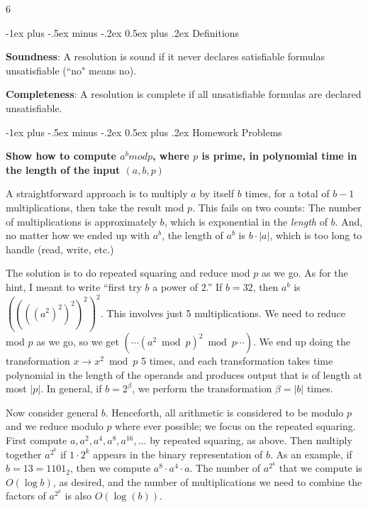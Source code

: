 \documentclass[2pt,legalpaper]{scrartcl}
\makeatletter
\renewcommand{\section}{\@startsection{section}{1}{0mm}
  {-1ex plus -.5ex minus -.2ex}
  {0.5ex plus .2ex}
{\normalfont\large\bfseries}}
\makeatother
\begin{document}
\begin{multicols}{6}
\begin{itemize}
  \end{itemize}


  \section{Definitions}

  {\bf Soundness}: A resolution is sound if it never declares satisfiable formulas unsatisfiable (``no" means no).

  {\bf Completeness}: A resolution is complete if all unsatisfiable formulas are declared unsatisfiable.

  \section{Homework Problems}

  {\bf Show how to compute $a^b mod p$, where $p$ is prime, in polynomial time in the length of the input $(a, b, p)$}

  A straightforward approach is to multiply $a$ by itself $b$
  times, for a total of $b-1$ multiplications, then take the result mod
  $p$.  This fails on two counts:  The number of multiplications is
  approximately $b$, which is exponential in the {\em length} of $b$.
  And, no matter how we ended up with $a^b$, the length of $a^b$ is
  $b\cdot|a|$, which is too long to handle (read, write, etc.)

  The solution is to do repeated squaring and reduce mod $p$ as we go.
  As for the hint, I meant to write ``first try $b$ a power of 2.''  If
  $b=32$, then $a^b$ is $((((a^2)^2)^2)^2)^2$.  This involves just 5
  multiplications.  We need to reduce mod $p$ as we go, so we get
  $(\cdots(a^2\bmod p)^2\bmod p\cdots)$.  We end up doing the
  transformation $x\to x^2\bmod p$ 5 times, and each transformation
  takes time polynomial in the length of the operands and produces
  output that is of length at most $|p|$.  In general, if $b=2^\beta$,
  we perform the transformation $\beta=|b|$ times.

  Now consider general $b$.  Henceforth, all arithmetic is considered to
  be modulo $p$ and we reduce modulo $p$ where ever possible; we focus
  on the repeated squaring.  First compute $a,a^2,a^4,a^8,a^{16},\ldots$
  by repeated squaring, as above.  Then multiply together $a^{2^k}$ if
  $1\cdot 2^k$ appears in the binary representation of $b$.  As an
  example, if $b=13=1101_2$, then we compute $a^8\cdot a^4\cdot a$.  The
  number of $a^{2^k}$ that we compute is $O(\log b)$, as desired, and
  the number of multiplications we need to combine the factors of
  $a^{2^k}$ is also $O(\log(b))$.


\end{multicols}
\end{document}
